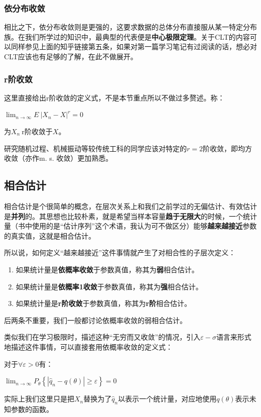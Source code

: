 \documentclass[10pt, a4paper]{article}
\begin{document}
\subsubsection*{依分布收敛}
相比之下，依分布收敛则是更强的，这要求数据的总体分布直接服从某一特定分布族。在我们所学过的知识中，最典型的代表便是\textbf{中心极限定理}。关于CLT的内容可以同样参见上面的知乎链接第五条，如果对第一篇学习笔记有过阅读的话，想必对CLT应该也有足够的了解，在此不做展开。

\subsubsection*{r阶收敛}
这里直接给出r阶收敛的定义式，不是本节重点所以不做过多赘述。称：
\begin{center}
    $ \lim _{n \rightarrow \infty} E~| X_{n} - X | ^r =0$
\end{center}
为$X_n~$r阶收敛于$X$。\par
研究随机过程、机械振动等较传统工科的同学应该对特定的$r=2$阶收敛，即均方收敛（亦作m. s. 收敛）更加熟悉。

\subsection{相合估计}
相合估计是个很简单的概念，在层次关系上和我们之前学过的无偏估计、有效估计是\textbf{并列}的。其思想也比较朴素，就是希望当样本容量\textbf{趋于无限大}的时候，一个统计量（书中使用的是“估计序列”这个术语，我认为可不做区分）能够\textbf{越来越接近}参数的真实值，这就是相合估计。\par
所以说，如何定义“越来越接近”这件事情就产生了对相合性的子层次定义：
\begin{enumerate}
    \item 如果统计量是\textbf{依概率收敛}于参数真值，称其为\textbf{弱}相合估计。
    \item 如果统计量是\textbf{依概率1收敛}于参数真值，称其为\textbf{强}相合估计。
    \item 如果统计量是\textbf{r阶收敛}于参数真值，称其为\textbf{r阶}相合估计。
\end{enumerate} \par
后两条不重要，我们一般都讨论依概率收敛的弱相合估计。\par
类似我们在学习极限时，描述这种“无穷而又收敛”的情况，引入$\varepsilon-\sigma$语言来形式地描述这件事情，可以直接套用依概率收敛的定义式：\par
对于$\forall \varepsilon > 0$有：
\begin{center}
    $\lim _{n \rightarrow \infty} P_\theta\left\{\left|\hat{q}_n - q(\theta) \right| \geq \varepsilon\right\}=0$
\end{center} \par
实际上我们这里只是把$X_n$替换为了$\hat{q}_n$以表示一个统计量，对应地使用$q(\theta)$表示未知参数的函数。
\end{document}
